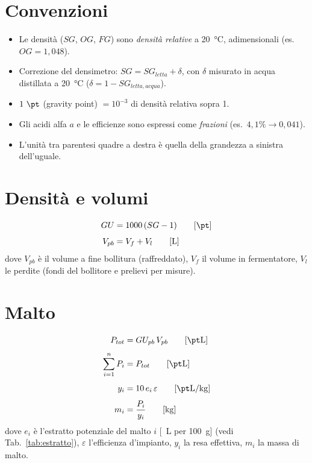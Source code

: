 \section*{Convenzioni}
\begin{itemize}
  \item Le densità ($SG$, $OG$, $FG$) sono \emph{densità relative} a \SI{20}{\celsius}, adimensionali (es.\ $OG = 1{,}048$).
  \item Correzione del densimetro: $SG = SG_{letta} + \delta$, con $\delta$ misurato in acqua distillata a \SI{20}{\celsius} ($\delta = 1 - SG_{letta,acqua}$).
  \item $1\ \si{\pt}$ (gravity point) $= 10^{-3}$ di densità relativa sopra 1.
  \item Gli acidi alfa $a$ e le efficienze sono espressi come \emph{frazioni} (es.\ $4{,}1\% \to 0{,}041$).
  \item L'unità tra parentesi quadre a destra è quella della grandezza a sinistra dell'uguale.
\end{itemize}

\section{Densità e volumi}

\begin{align}
GU &= 1000\,(SG - 1) \un{\si{\pt}} \\[4pt]
V_{pb} &= V_f + V_l \un{\si{\liter}}
\end{align}
dove $V_{pb}$ è il volume a fine bollitura (raffreddato), $V_f$ il volume in fermentatore, $V_l$ le perdite (fondi del bollitore e prelievi per misure).

\section{Malto}

\begin{align}
P_{tot} &= GU_{pb}\, V_{pb} \un{\si{\pt\liter}} \\[4pt]
\sum_{i=1}^{n} P_i &= P_{tot} \un{\si{\pt\liter}} \\[4pt]
y_i &= 10\, e_i\, \varepsilon \un{\si{\pt\liter\per\kilo\gram}} \\[4pt]
m_i &= \frac{P_i}{y_i} \un{\si{\kilo\gram}}
\end{align}
dove $e_i$ è l'estratto potenziale del malto $i$ [\si{\pt\liter} per \SI{100}{\gram}] (vedi Tab.~\ref{tab:estratto}), $\varepsilon$ l'efficienza d'impianto, $y_i$ la resa effettiva, $m_i$ la massa di malto.

